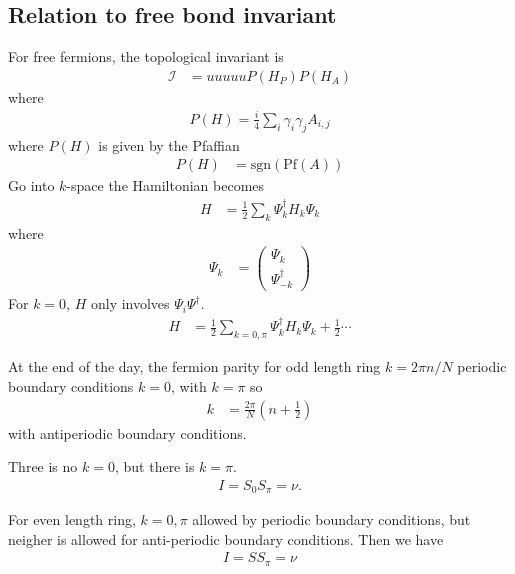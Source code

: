 \subsection{Relation to free bond invariant}
For free fermions,
the topological invariant is
\begin{align}
    \mathcal{I} &=uuuuu
    P\left( H_P \right) P\left( H_A \right)
\end{align}
where
\begin{align}
    P(H) = \frac{i}{4} \sum_{i} \gamma_i \gamma_j A_{i,j}
\end{align}
where $P(H)$ is given by the Pfaffian
\begin{align}
    P(H) &= \textrm{sgn}(\textrm{Pf}(A))
\end{align}
Go into $k$-space the Hamiltonian becomes
\begin{align}
    H &=
    \frac{1}{2} \sum_{k}
    \Psi_k^\dagger H_k \Psi_k
\end{align}
where
\begin{align}
    \Psi_k &=
    \begin{pmatrix}
        \Psi_k\\
        \Psi_{-k}^\dagger
    \end{pmatrix}
\end{align}
For $k=0$,
$H$
only 
involves $\Psi_i\Psi^\dagger$.
\begin{align}
    H &=
    \frac{1}{2} \sum_{k = 0, \pi}
    \Psi_k^\dagger
    H_k\Psi_{k}
    + \frac{1}{2}\cdots
\end{align}

At the end of the day,
the fermion parity for odd length ring
$k=2\pi n/N$ periodic boundary conditions
$k=0$, with $k=\pi$ so
\begin{align}
    k &= \frac{2\pi}{N}\left( n + \frac{1}{2} \right)
\end{align}
with antiperiodic boundary conditions.

Three is no $k=0$,
but there is $k=\pi$.
\begin{align}
    I = S_0 S_\pi = \nu.
\end{align}

For even length ring,
$k=0,\pi$ allowed by periodic boundary conditions,
but neigher is allowed for anti-periodic boundary conditions.
Then we have
\begin{align}
    I = S S_{\pi} = \nu
\end{align}

